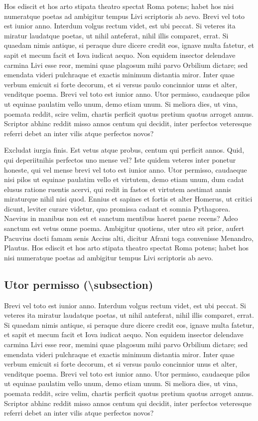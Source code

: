 \documentclass[nochapterpage,bigchapter,linedtoc,longdoc,colorback,accentcolor=tud4c]{tudreport}
\begin{document}
    Hos ediscit et hos arto stipata theatro spectat Roma potens; habet hos nisi numeratque poetas ad ambigitur tempus Livi scriptoris ab aevo. Brevi vel toto est iunior anno. Interdum volgus rectum videt, est ubi peccat. Si veteres ita miratur laudatque poetas, ut nihil anteferat, nihil illis comparet, errat. 
    Si quaedam nimis antique, si peraque dure dicere credit eos, ignave multa fatetur, et sapit et mecum facit et Iova iudicat aequo. Non equidem insector delendave carmina Livi esse reor, memini quae plagosum mihi parvo Orbilium dictare; sed emendata videri pulchraque et exactis minimum distantia miror. Inter quae verbum emicuit si forte decorum, et si versus paulo concinnior unus et alter, venditque poema. Brevi vel toto est iunior anno. Utor permisso, caudaeque pilos ut equinae paulatim vello unum, demo etiam unum. Si meliora dies, ut vina, poemata reddit, scire velim, chartis perficit quotus pretium quotus arroget annus. Scriptor abhinc reddit misso annos centum qui decidit, inter perfectos veteresque referri debet an inter vilis atque perfectos novos?

    Excludat iurgia finis. Est vetus atque probus, centum qui perficit annos. Quid, qui deperiitnihis perfectos uno mense vel? Iste quidem veteres inter ponetur honeste, qui vel mense brevi vel toto est iunior anno. Utor permisso, caudaeque nisi pilos ut equinae paulatim vello et virtutem, demo etiam unum, dum cadat elusus ratione ruentis acervi, qui redit in fastos et virtutem aestimat annis miraturque nihil nisi quod. Ennius et sapines et fortis et alter Homerus, ut critici dicunt, leviter curare videtur, quo promissa cadant et somnia Pythagorea.  Naevius in manibus non est et sanctum mentibus haeret paene recens?  Adeo sanctum est vetus omne poema. Ambigitur quotiens, uter utro sit prior, aufert Pacuvius docti famam senis Accius alti, dicitur Afrani toga convenisse Menandro, Plautus. Hos ediscit et hos arto stipata theatro spectat Roma potens; habet hos nisi numeratque poetas ad ambigitur tempus Livi scriptoris ab aevo.

  \subsection{Utor permisso (\textbackslash subsection)}

    Brevi vel toto est iunior anno. Interdum volgus rectum videt, est ubi peccat. Si veteres ita miratur laudatque poetas, ut nihil anteferat, nihil illis comparet, errat.  Si quaedam nimis antique, si peraque dure dicere credit eos, ignave multa fatetur, et sapit et mecum facit et Iova iudicat aequo. Non equidem insector delendave carmina Livi esse reor, memini quae plagosum mihi parvo Orbilium dictare; sed emendata videri pulchraque et exactis minimum distantia miror.
    Inter quae verbum emicuit si forte decorum, et si versus paulo concinnior unus et alter, venditque poema.
    Brevi vel toto est iunior anno. Utor permisso, caudaeque pilos ut equinae paulatim vello unum, demo etiam unum. Si meliora dies, ut vina, poemata reddit, scire velim, chartis perficit quotus pretium quotus arroget annus. Scriptor abhinc reddit misso annos centum qui decidit, inter perfectos veteresque referri debet an inter vilis atque perfectos novos?
\end{document}
